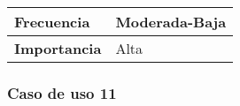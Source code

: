 \begin{longtable}{lll}
\textbf{Frecuencia}                              & \multicolumn{2}{l}{Moderada-Baja}                                                                                                                                                                                                                                                \\ \hline
\textbf{Importancia}                             & \multicolumn{2}{l}{Alta}                                                                                                                                                                                                                                                         \\ \hline
\end{longtable}

\subsubsection{Caso de uso 11}
